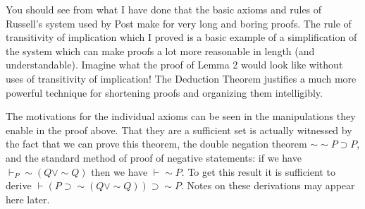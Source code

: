 \documentclass[12pt]{article}
\begin{document}
You should see from what I have done that the basic axioms and rules of Russell's system used by Post make for very long and boring proofs.  The rule of transitivity of implication which 
I proved is a basic example of a simplification of the system which can make proofs a lot more reasonable in length (and understandable).  Imagine what the proof of Lemma 2 would look like without uses of transitivity of implication!  The Deduction Theorem justifies a much more powerful technique for shortening proofs and organizing them intelligibly.

The motivations for the individual axioms can be seen in the manipulations they enable in the proof above.  That they are a sufficient set is actually witnessed by the fact that we can prove this theorem, the double negation theorem $\sim \sim P \supset P$,  and the standard method  of proof of negative statements:  if we have $\vdash_P \sim(Q \vee \sim Q)$ then we have $\vdash \sim P$.  To get this result it is sufficient to
derive $\vdash (P \supset \sim(Q \vee \sim Q)) \supset \sim P$.  Notes on these derivations may appear here later.
\end{document}
